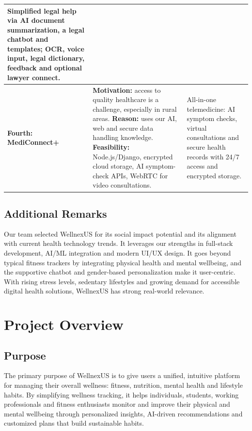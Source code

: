 \documentclass[11pt,a4paper]{report}
\begin{document}
\begin{longtable}{|p{1.8cm}|p{7.4cm}|p{5.2cm}|}
Simplified legal help via AI document summarization, a legal chatbot and templates; OCR, voice input, legal dictionary, feedback and optional lawyer connect.\\\hline
\textbf{Fourth: MediConnect+} &
\textbf{Motivation:} access to quality healthcare is a challenge, especially in rural areas.\newline
\textbf{Reason:} uses our AI, web and secure data handling knowledge.\newline
\textbf{Feasibility:} Node.js/Django, encrypted cloud storage, AI symptom-check APIs, WebRTC for video consultations. &
All-in-one telemedicine: AI symptom checks, virtual consultations and secure health records with 24/7 access and encrypted storage.\\\hline
\end{longtable}
\normalsize

\subsection*{Additional Remarks}
Our team selected WellnexUS for its social impact potential and its alignment with current health technology trends. It leverages our strengths in full-stack development, AI/ML integration and modern UI/UX design. It goes beyond typical fitness trackers by integrating physical health and mental wellbeing, and the supportive chatbot and gender-based personalization make it user-centric. With rising stress levels, sedentary lifestyles and growing demand for accessible digital health solutions, WellnexUS has strong real-world relevance.

\section{Project Overview}

\subsection{Purpose}
The primary purpose of WellnexUS is to give users a unified, intuitive platform for managing their overall wellness: fitness, nutrition, mental health and lifestyle habits. By simplifying wellness tracking, it helps individuals, students, working professionals and fitness enthusiasts monitor and improve their physical and mental wellbeing through personalized insights, AI-driven recommendations and customized plans that build sustainable habits.
\end{document}
